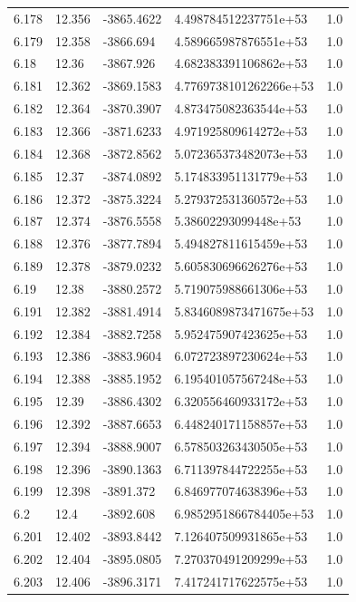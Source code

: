\begin{tabular}{lllll}
6.178 & 12.356 & -3865.4622 & 4.498784512237751e+53 & 1.0 \\
6.179 & 12.358 & -3866.694 & 4.589665987876551e+53 & 1.0 \\
6.18 & 12.36 & -3867.926 & 4.682383391106862e+53 & 1.0 \\
6.181 & 12.362 & -3869.1583 & 4.7769738101262266e+53 & 1.0 \\
6.182 & 12.364 & -3870.3907 & 4.873475082363544e+53 & 1.0 \\
6.183 & 12.366 & -3871.6233 & 4.971925809614272e+53 & 1.0 \\
6.184 & 12.368 & -3872.8562 & 5.072365373482073e+53 & 1.0 \\
6.185 & 12.37 & -3874.0892 & 5.174833951131779e+53 & 1.0 \\
6.186 & 12.372 & -3875.3224 & 5.279372531360572e+53 & 1.0 \\
6.187 & 12.374 & -3876.5558 & 5.38602293099448e+53 & 1.0 \\
6.188 & 12.376 & -3877.7894 & 5.494827811615459e+53 & 1.0 \\
6.189 & 12.378 & -3879.0232 & 5.605830696626276e+53 & 1.0 \\
6.19 & 12.38 & -3880.2572 & 5.719075988661306e+53 & 1.0 \\
6.191 & 12.382 & -3881.4914 & 5.8346089873471675e+53 & 1.0 \\
6.192 & 12.384 & -3882.7258 & 5.952475907423625e+53 & 1.0 \\
6.193 & 12.386 & -3883.9604 & 6.072723897230624e+53 & 1.0 \\
6.194 & 12.388 & -3885.1952 & 6.195401057567248e+53 & 1.0 \\
6.195 & 12.39 & -3886.4302 & 6.320556460933172e+53 & 1.0 \\
6.196 & 12.392 & -3887.6653 & 6.448240171158857e+53 & 1.0 \\
6.197 & 12.394 & -3888.9007 & 6.578503263430505e+53 & 1.0 \\
6.198 & 12.396 & -3890.1363 & 6.711397844722255e+53 & 1.0 \\
6.199 & 12.398 & -3891.372 & 6.846977074638396e+53 & 1.0 \\
6.2 & 12.4 & -3892.608 & 6.9852951866784405e+53 & 1.0 \\
6.201 & 12.402 & -3893.8442 & 7.126407509931865e+53 & 1.0 \\
6.202 & 12.404 & -3895.0805 & 7.270370491209299e+53 & 1.0 \\
6.203 & 12.406 & -3896.3171 & 7.417241717622575e+53 & 1.0 \\

\end{tabular}
